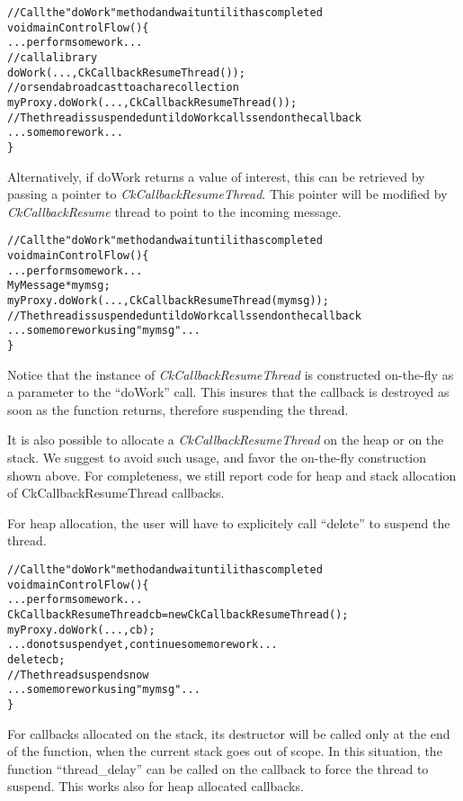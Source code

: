 \begin{alltt}
// Call the "doWork" method and wait until it has completed
void mainControlFlow() \{
  ...perform some work...
  // call a library
  doWork(...,CkCallbackResumeThread());
  // or send a broadcast to a chare collection
  myProxy.doWork(...,CkCallbackResumeThread());
  // The thread is suspended until doWork calls send on the callback
  ...some more work...
\}
\end{alltt}

Alternatively, if doWork returns a value of interest, this can be retrieved by
passing a pointer to {\em CkCallbackResumeThread}. This pointer will be modified
by {\em CkCallbackResume} thread to point to the incoming message.

\begin{alltt}
// Call the "doWork" method and wait until it has completed
void mainControlFlow() \{
  ...perform some work...
  MyMessage *mymsg;
  myProxy.doWork(...,CkCallbackResumeThread(mymsg));
  // The thread is suspended until doWork calls send on the callback
  ...some more work using "mymsg"...
\}
\end{alltt}

Notice that the instance of {\em CkCallbackResumeThread} is constructed
on-the-fly as a parameter to the ``doWork'' call. This insures that the callback
is destroyed as soon as the function returns, therefore suspending the thread.

It is also possible to allocate a {\em CkCallbackResumeThread} on the heap or on
the stack. We suggest to avoid such usage, and favor the on-the-fly construction
shown above. For completeness, we still report code for heap and stack
allocation of CkCallbackResumeThread callbacks.

For heap allocation, the user will have to explicitely call ``delete'' to
suspend the thread.

\begin{alltt}
// Call the "doWork" method and wait until it has completed
void mainControlFlow() \{
  ...perform some work...
  CkCallbackResumeThread cb = new CkCallbackResumeThread();
  myProxy.doWork(...,cb);
  ...do not suspend yet, continue some more work...
  delete cb;
  // The thread suspends now
  ...some more work using "mymsg"...
\}
\end{alltt}

For callbacks allocated on the stack, its destructor will be called only at the
end of the function, when the current stack goes out of scope. In this
situation, the function ``thread_delay'' can be called on the callback to
force the thread to suspend. This works also for heap allocated callbacks.


